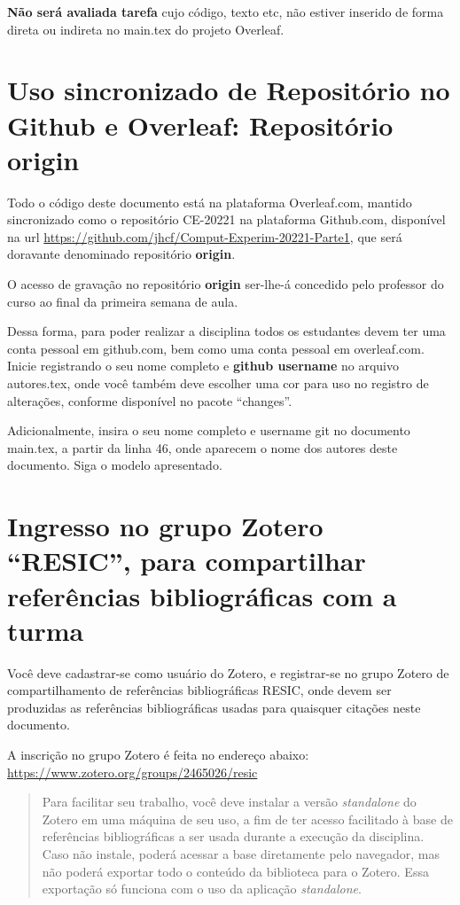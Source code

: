 \textbf{Não será avaliada tarefa} cujo código, texto etc, não estiver inserido de forma direta ou indireta no main.tex do projeto Overleaf.

\section{Uso sincronizado de Repositório no Github e Overleaf: Repositório \textbf{origin}}

Todo o código deste documento está na plataforma Overleaf.com, mantido sincronizado como o repositório CE-20221 na plataforma Github.com, disponível na url \url{https://github.com/jhcf/Comput-Experim-20221-Parte1}, que será doravante denominado repositório \textbf{origin}.

O acesso de gravação no repositório \textbf{origin} ser-lhe-á concedido pelo professor do curso ao final da primeira semana de aula.

Dessa forma, para poder realizar a disciplina todos os estudantes devem ter uma conta pessoal em github.com, bem como uma conta pessoal em overleaf.com. Inicie registrando o seu nome completo e \textbf{github username} no arquivo autores.tex, onde você também deve escolher uma cor para uso no registro de alterações, conforme disponível no pacote ``changes''.

Adicionalmente, insira o seu nome completo e username git no documento main.tex, a partir da linha 46, onde aparecem o nome dos autores deste documento. Siga o modelo apresentado.

\section{Ingresso no grupo Zotero ``RESIC'', para  compartilhar referências bibliográficas com a turma}

Você deve cadastrar-se como usuário do Zotero, e registrar-se no grupo Zotero de compartilhamento de referências bibliográficas RESIC, onde devem ser produzidas as referências bibliográficas usadas para quaisquer citações neste documento.

A inscrição no grupo Zotero é feita no endereço abaixo:
\url{https://www.zotero.org/groups/2465026/resic}

\begin{quote}
Para facilitar seu trabalho, você deve instalar a versão \textit{standalone} do Zotero em uma máquina de seu uso, a fim de ter acesso facilitado à base de referências bibliográficas a ser usada durante a execução da disciplina. Caso não instale, poderá acessar a base diretamente pelo navegador, mas não poderá exportar todo o conteúdo da biblioteca para o Zotero. Essa exportação só funciona com o uso da aplicação \textit{standalone}.
\end{quote}

